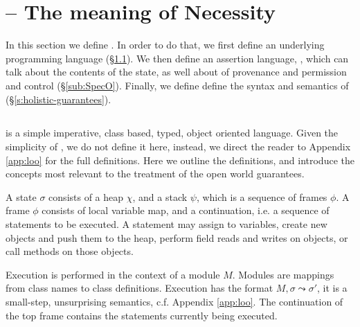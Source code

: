 \section{\Chainspec -- The meaning of Necessity}
\label{s:semantics}

In this section we   define  \Chainspec.
In order to do that, we first define 
an underlying programming language \Loo  (\S \ref{sub:Loo}).
We then  define an assertion language, \SpecO,  which can talk about
 the contents of the state, as well about 
  of provenance and permission and control (\S \ref{sub:SpecO}).
Finally, we define define the syntax and semantics of \Chainspec  (\S \ref{s:holistic-guarantees}).



\subsection{\Loo}
\label{sub:Loo} 
 \Loo is a  simple  imperative,
class based, typed, object oriented language. 
Given the simplicity of \Loo, we do not
define it here, instead, we direct the reader to Appendix \ref{app:loo} for 
the full definitions. %
Here we outline the definitions, and  introduce the concepts most relevant to the
treatment of the open world guarantees.


A \Loo state $\sigma$ consists of a 
heap $\chi$, and a  {stack $\psi$, which is a sequence of frames $\phi$}.
A frame $\phi$ consists of
local variable map, and a continuation, i.e. a sequence of statements to be executed.
 A statement may assign to variables, create new objects and push them to the heap, 
perform field reads and writes on objects,  or
 call methods on those objects. 

Execution is  performed in the context of a module $M$. Modules are mappings
from class names to class definitions. 
Execution has the format  $M, \sigma \leadsto \sigma'$, it is a small-step, unsurprising semantics,   c.f. Appendix \ref{app:loo}.
The   continuation of the top frame contains the statements currently being executed.
 
